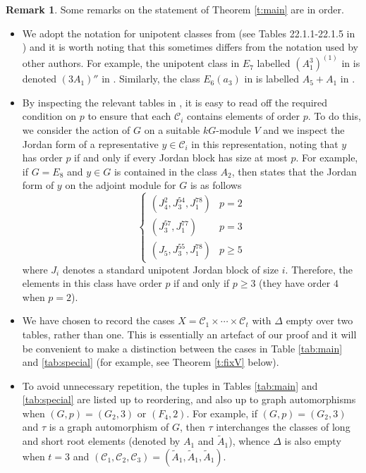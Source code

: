\documentclass[twoside,a4paper,reqno,11pt]{amsart}
\newcommand{\<}{\langle}
\renewcommand{\>}{\rangle}
\newcommand{\geqs}{\geqslant}
\renewcommand{\:}{\colon}
\theoremstyle{plain}
\theoremstyle{definition}
\newtheorem{remk}{Remark}
\begin{document}
\begin{remk}\label{r:main}
Some remarks on the statement of Theorem \ref{t:main} are in order.
\begin{itemize}\addtolength{\itemsep}{0.2\baselineskip}
\item[{\rm (a)}] We adopt the notation for unipotent classes from \cite{LS_book} (see Tables 22.1.1-22.1.5 in \cite{LS_book}) and it is worth noting that this sometimes differs from the notation used by other authors. For example, the unipotent class in $E_7$ labelled $(A_1^3)^{(1)}$ in \cite{LS_book} is denoted $(3A_1)''$ in \cite{Law1,Spal}. Similarly, the class $E_6(a_3)$ in \cite{Law1,LS_book} is labelled $A_5+A_1$ in \cite{Spal}. 
\item[{\rm (b)}] By inspecting the relevant tables in \cite{Law1}, it is easy to read off the required condition on $p$ to ensure that each $\mathcal{C}_i$ contains elements of order $p$. To do this, we consider the action of $G$ on a suitable $kG$-module $V$ and we inspect the Jordan form of a representative $y \in \mathcal{C}_i$ in this representation, noting that $y$ has order $p$ if and only if every Jordan block has size at most $p$. For example, if $G = E_8$ and $y \in G$ is contained in the class $A_2$, then \cite[Table 9]{Law1} states that the Jordan form of $y$ on the adjoint module for $G$ is as follows
\[
\left\{\begin{array}{ll}
(J_4^2,J_3^{54},J_1^{78}) & p = 2 \\
(J_3^{57},J_1^{77}) & p = 3 \\
(J_5,J_3^{55},J_1^{78}) & p \geqs 5
\end{array}\right.
\]
where $J_i$ denotes a standard unipotent Jordan block of size $i$. Therefore, the elements in this class have order $p$ if and only if $p \geqs 3$ (they have order $4$ when $p=2$). 
\item[{\rm (c)}] We have chosen to record the cases $X = \mathcal{C}_1 \times \cdots \times \mathcal{C}_t$ with $\Delta$ empty over two tables, rather than one. This is essentially an artefact of our proof and it will be convenient to make a distinction between the cases in Table \ref{tab:main} and \ref{tab:special} (for example, see Theorem \ref{t:fixV} below).
\item[{\rm (d)}] To avoid unnecessary repetition, the tuples in Tables \ref{tab:main} and \ref{tab:special} are listed up to reordering, and also up to graph automorphisms when $(G,p) = (G_2,3)$ or $(F_4,2)$. For example, if $(G,p) = (G_2,3)$ and $\tau$ is a graph automorphism of $G$, then $\tau$ interchanges the classes of long and short root elements (denoted by $A_1$ and $\tilde{A}_1$), whence $\Delta$ is also empty when $t=3$ and $(\mathcal{C}_1,\mathcal{C}_2,\mathcal{C}_3) = (\tilde{A}_1,\tilde{A}_1,\tilde{A}_1)$. 
\end{itemize}
\end{remk}
\end{document}
